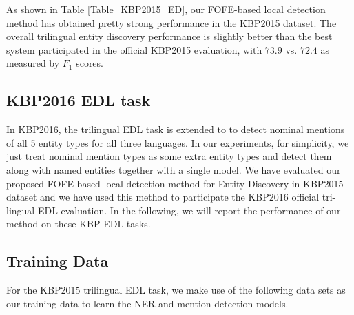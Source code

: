 \documentclass[11pt,a4paper]{article}
\begin{document}
As shown in Table \ref{Table_KBP2015_ED}, our FOFE-based local detection method has obtained pretty strong performance in the KBP2015 dataset. The overall trilingual entity discovery performance is slightly better than the best system participated in the official KBP2015 evaluation, with $73.9$ vs. $72.4$ as measured by $F_1$ scores.

\subsection{KBP2016 EDL task}

In KBP2016, the trilingual EDL task is extended to to detect nominal mentions of all 5 entity types for all three languages. In our experiments, for simplicity, we just treat nominal mention types as some extra entity types and detect them along with named entities together with a single model.  
We have evaluated our proposed FOFE-based local detection method for Entity Discovery in KBP2015 dataset and we have used this method to participate the KBP2016 official tri-lingual EDL evaluation. In the following, we will report the performance of our method on these KBP EDL tasks. 


\subsection{Training Data}

For the KBP2015  trilingual EDL task, we make use of the following data sets as our training data to learn the NER and mention detection models. 
\end{document}
